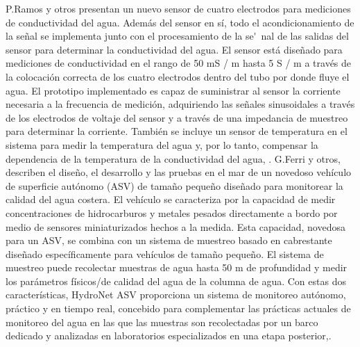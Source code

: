P.Ramos y otros  presentan un nuevo sensor de cuatro electrodos para mediciones de conductividad del agua. Adem\'as del sensor en s\'i, todo el acondicionamiento de la se\~nal se implementa junto con el procesamiento de la se\'~nal de las salidas del sensor para determinar la conductividad del agua. El sensor est\'a dise\~nado para mediciones de conductividad en el rango de 50 mS / m hasta 5 S / m a trav\'es de la colocaci\'on correcta de los cuatro electrodos dentro del tubo por donde fluye el agua. El prototipo implementado es capaz de suministrar al sensor la corriente necesaria a la frecuencia de medici\'on, adquiriendo las señales sinusoidales a trav\'es de los electrodos de voltaje del sensor y a trav\'es de una impedancia de muestreo para determinar la corriente. Tambi\'en se incluye un sensor de temperatura en el sistema para medir la temperatura del agua y, por lo tanto, compensar la dependencia de la temperatura de la conductividad del agua, \cite{ramos2008four}.
G.Ferri y otros, describen el diseño, el desarrollo y las pruebas en el mar de un novedoso vehículo de superficie autónomo (ASV) de tamaño pequeño diseñado para monitorear la calidad del agua costera. El vehículo se caracteriza por la capacidad de medir concentraciones de hidrocarburos y metales pesados directamente a bordo por medio de sensores miniaturizados hechos a la medida. Esta capacidad, novedosa para un ASV, se combina con un sistema de muestreo basado en cabrestante diseñado específicamente para vehículos de tamaño pequeño. El sistema de muestreo puede recolectar muestras de agua hasta 50 m de profundidad y medir los parámetros físicos/de calidad del agua de la columna de agua. Con estas dos características, HydroNet ASV proporciona un sistema de monitoreo autónomo, práctico y en tiempo real, concebido para complementar las prácticas actuales de monitoreo del agua en las que las muestras son recolectadas por un barco dedicado y analizadas en laboratorios especializados en una etapa posterior,\cite{ferri_hydronet_2015}.


